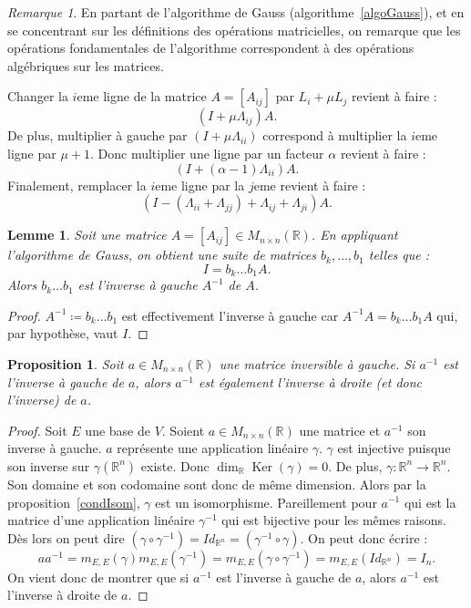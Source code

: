 \documentclass{article}
\DeclareMathOperator{\Ker}{Ker}
\newcommand{\R}{\mathbb R}
\newcommand{\M}[3]{M_{#1 \times #2}(#3)}
\newtheorem{prp}[thm]{Proposition}
\newtheorem{lem}[thm]{Lemme}
\theoremstyle{definition}
\theoremstyle{remark}
\newtheorem*{rmq}{Remarque}
\begin{document}
		\begin{rmq} En partant de l'algorithme de Gauss (algorithme~\ref{algoGauss}), et en se concentrant sur les définitions des opérations matricielles, on remarque que
		les opérations fondamentales de l'algorithme correspondent à des opérations algébriques sur les matrices.
		
		Changer la $i$eme ligne de la matrice $A = [A_{ij}]$ par $L_i + \mu L_j$ revient à faire : \[(I + \mu \Lambda_{ij})A.\] De plus, multiplier à gauche par
		$(I + \mu\Lambda_{ii})$ correspond à multiplier la $i$eme ligne par $\mu+1$. Donc multiplier une ligne par un facteur $\alpha$ revient à faire :
		\[(I + (\alpha-1)\Lambda_{ii})A.\] Finalement, remplacer la $i$eme ligne par la $j$eme revient à faire :
		\[(I - (\Lambda_{ii} + \Lambda_{jj}) + \Lambda_{ij} + \Lambda_{ji})A.\] \end{rmq}

		\begin{lem} Soit une matrice $A = [A_{ij}] \in \M nn\R$. En appliquant l'algorithme de Gauss, on obtient une suite de matrices $b_k, \ldots, b_1$ telles que :
		\[I = b_k\ldots b_1A.\] Alors $b_k \ldots b_1$ est l'inverse à gauche $A^{-1}$ de $A$. \end{lem}

		\begin{proof} $A^{-1} \coloneqq b_k\ldots b_1$ est effectivement l'inverse à gauche car $A^{-1}A = b_k\ldots b_1A$ qui, par hypothèse, vaut $I$. \end{proof}

		\begin{prp} Soit $a \in \M nn\R$ une matrice inversible à gauche. Si $a^{-1}$ est l'inverse à gauche de $a$, alors $a^{-1}$ est également l'inverse à droite
		(et donc l'inverse) de $a$. \end{prp}

		\begin{proof} Soit $E$ une base de $V$. Soient $a \in \M nn\R$ une matrice et $a^{-1}$ son inverse à gauche. $a$ représente une application linéaire $\gamma$.
		$\gamma$ est injective puisque son inverse sur $\gamma(\R^n)$ existe. Donc $\dim_\R\Ker(\gamma) = 0$. De plus, $\gamma : \R^n \to \R^n$. Son domaine et son codomaine
		sont donc de même dimension. Alors par la proposition~\ref{condIsom}, $\gamma$ est un isomorphisme. Pareillement pour $a^{-1}$ qui est la matrice d'une application
		linéaire $\gamma^{-1}$ qui est bijective pour les mêmes raisons. Dès lors on peut dire $(\gamma \circ \gamma^{-1}) = Id_{\R^n} = (\gamma^{-1} \circ \gamma)$. On peut
		donc écrire : \[aa^{-1} = m_{E, E}(\gamma)m_{E, E}(\gamma^{-1}) = m_{E, E}(\gamma \circ \gamma^{-1}) = m_{E, E}(Id_{\R^n}) = I_n.\]
		On vient donc de montrer que si $a^{-1}$ est l'inverse à gauche de $a$, alors $a^{-1}$ est l'inverse à droite de $a$. \end{proof}
\end{document}
